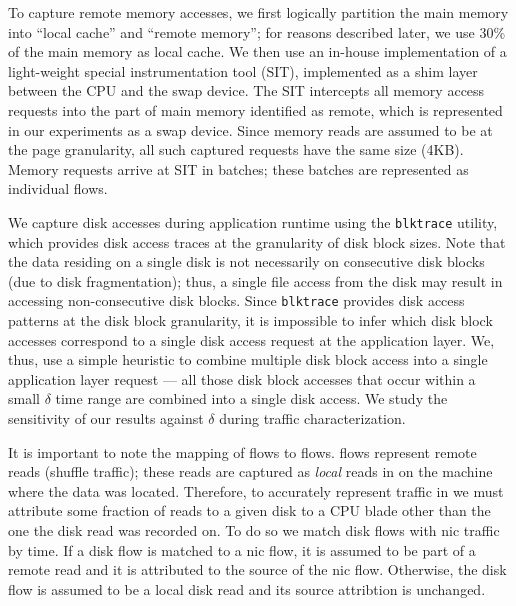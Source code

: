 To capture remote memory accesses, we first logically partition the main memory into ``local cache'' and ``remote memory''; for reasons described later, we use $30\%$ of the main memory as local cache. We then use an in-house implementation of a light-weight special instrumentation tool (SIT), implemented as a shim layer between the CPU and the swap device. The SIT intercepts all memory access requests into the part of main memory identified as remote, which is represented in our experiments as a swap device. Since memory reads are assumed to be at the page granularity, all such captured requests have the same size (4KB). Memory requests arrive at SIT in batches; these batches are represented as individual flows.  

We capture disk accesses during application runtime using the {\tt blktrace} utility, which provides disk access traces at the granularity of disk block sizes. Note that the data residing on a single disk is not necessarily on consecutive disk blocks (due to disk fragmentation); thus, a single file access from the disk may result in accessing non-consecutive disk blocks. Since {\tt blktrace} provides disk access patterns at the disk block granularity, it is impossible to infer which disk block accesses correspond to a single disk access request at the application layer. We, thus, use a simple heuristic to combine multiple disk block access into a single application layer request --- all those disk block accesses that occur within a small $\delta$ time range are combined into a single disk access. We study the sensitivity of our results against $\delta$ during traffic characterization. 

 It is important to note the mapping of \pdis flows to \dis flows. \pdis flows represent remote reads (\ie shuffle traffic); these reads are captured as \emph{local} reads in \dis on the machine where the data was located. Therefore, to accurately represent traffic in \dis we must attribute some fraction of reads to a given disk to a CPU blade other than the one the disk read was recorded on. To do so we match disk flows with nic traffic by time. If a disk flow is matched to a nic flow, it is assumed to be part of a remote read and it is attributed to the source of the nic flow. Otherwise, the disk flow is assumed to be a local disk read and its source attribtion is unchanged.

